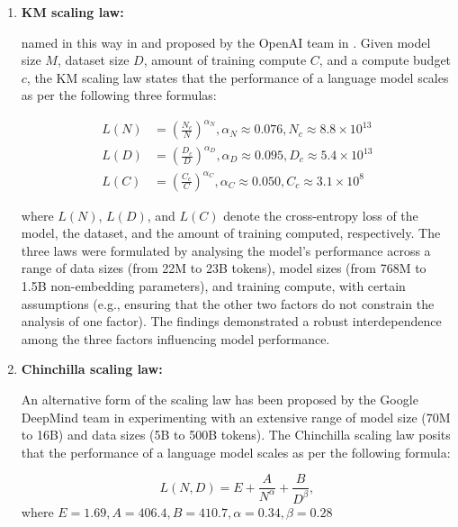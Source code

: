 \begin{enumerate}
	\item \textbf{KM scaling law:} {named in this way in \textcite{survey} and proposed by the OpenAI team in \textcite{kaplan2020scaling}. Given model size $M$, dataset size $D$, amount of training compute $C$, and a compute budget $c$, the KM scaling law states that the performance of a language model scales as per the following three formulas:

		      \begin{equation}
			      \begin{aligned}
				      L(N) & =(\frac{N_c}{N})^{\alpha_N}, \alpha_N \approx 0.076, N_c \approx 8.8 \times 10^{13} \\
				      L(D) & =(\frac{D_c}{D})^{\alpha_D}, \alpha_D \approx 0.095, D_c \approx 5.4 \times 10^{13} \\
				      L(C) & =(\frac{C_c}{C})^{\alpha_C}, \alpha_C \approx 0.050, C_c \approx 3.1 \times 10^8
			      \end{aligned}
			      \label{eq:km-scaling-law}
		      \end{equation}

		      where $L(N)$, $L(D)$, and $L(C)$ denote the cross-entropy loss of the model, the dataset, and the amount of training computed, respectively.
		      The three laws were formulated by analysing the model's performance across a range of data sizes (from 22M to 23B tokens), model sizes (from 768M to 1.5B non-embedding parameters), and training compute, with certain assumptions (e.g., ensuring that the other two factors do not constrain the analysis of one factor).
		      The findings demonstrated a robust interdependence among the three factors influencing model performance.
	      }
	\item \textbf{Chinchilla scaling law:} {An alternative form of the scaling law has been proposed by the Google DeepMind team in \textcite{hoffmann2022training} experimenting with an extensive range of model size (70M to 16B) and data sizes (5B to 500B tokens).
		      The Chinchilla scaling law posits that the performance of a language model scales as per the following formula:

		      \begin{equation}
			      L(N,D) = E + \frac{A}{N^\alpha} + \frac{B}{D^\beta},
			      \label{eq:chinchilla-scaling-law}
		      \end{equation}
		      \noindent where $E=1.69, A=406.4,B = 410.7, \alpha = 0.34, \beta = 0.28$

}
\end{enumerate}
